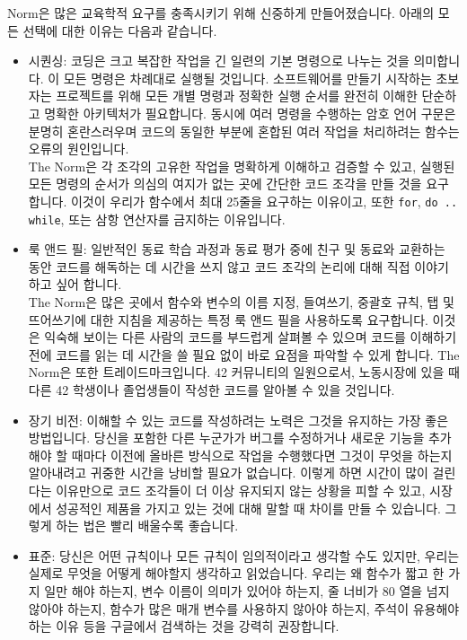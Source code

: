 \documentclass{42-ko}
\begin{document}
        Norm은 많은 교육학적 요구를 충족시키기 위해 신중하게 만들어졌습니다. 아래의
        모든 선택에 대한 이유는 다음과 같습니다.
        \begin{itemize}

        \item 시퀀싱: 코딩은 크고 복잡한 작업을 긴 일련의 기본 명령으로 나누는 것을 의미합니다.
          이 모든 명령은 차례대로 실행될 것입니다. 소프트웨어를 만들기 시작하는 초보자는 프로젝트를 위해 
          모든 개별 명령과 정확한 실행 순서를 완전히 이해한 단순하고 명확한 아키텍처가 필요합니다.
          동시에 여러 명령을 수행하는 암호 언어 구문은 분명히 혼란스러우며 코드의 동일한 부분에 혼합된 
          여러 작업을 처리하려는 함수는 오류의 원인입니다.\\
          The Norm은 각 조각의 고유한 작업을 명확하게 이해하고 검증할 수 있고, 실행된 모든 명령의 순서가 
          의심의 여지가 없는 곳에 간단한 코드 조각을 만들 것을 요구합니다. 이것이 우리가 함수에서 
          최대 25줄을 요구하는 이유이고, 또한 \texttt{for}, \texttt{do .. while}, 또는 삼항 연산자를 
          금지하는 이유입니다.

        \item 룩 앤드 필: 일반적인 동료 학습 과정과 동료 평가 중에 친구 및 동료와 교환하는 동안 
          코드를 해독하는 데 시간을 쓰지 않고 코드 조각의 논리에 대해 직접 이야기하고 싶어 합니다.\\
          The Norm은 많은 곳에서 함수와 변수의 이름 지정, 들여쓰기, 중괄호 규칙, 탭 및 뜨어쓰기에 
          대한 지침을 제공하는 특정 룩 앤드 필을 사용하도록 요구합니다. 이것은 익숙해 보이는 
          다른 사람의 코드를 부드럽게 살펴볼 수 있으며 코드를 이해하기 전에 코드를 읽는 데 시간을 쓸 필요 
          없이 바로 요점을 파악할 수 있게 합니다. The Norm은 또한 트레이드마크입니다. 42 커뮤니티의 
          일원으로서, 노동시장에 있을 때 다른 42 학생이나 졸업생들이 작성한 코드를 알아볼 수 있을 것입니다.

        \item 장기 비전: 이해할 수 있는 코드를 작성하려는 노력은 그것을 유지하는 가장 좋은 방법입니다.
          당신을 포함한 다른 누군가가 버그를 수정하거나 새로운 기능을 추가해야 할 때마다 이전에 올바른 
          방식으로 작업을 수행했다면 그것이 무엇을 하는지 알아내려고 귀중한 시간을 낭비할 필요가 없습니다.
          이렇게 하면 시간이 많이 걸린다는 이유만으로 코드 조각들이 더 이상 유지되지 않는 상황을 피할 수 있고,
          시장에서 성공적인 제품을 가지고 있는 것에 대해 말할 때 차이를 만들 수 있습니다. 그렇게 하는 법은 
          빨리 배울수록 좋습니다.

        \item 표준: 당신은 어떤 규칙이나 모든 규칙이 임의적이라고 생각할 수도 있지만, 우리는 실제로 무엇을 어떻게 
          해야할지 생각하고 읽었습니다. 우리는 왜 함수가 짧고 한 가지 일만 해야 하는지, 변수 이름이 의미가 있어야 
          하는지, 줄 너비가 80 열을 넘지 않아야 하는지, 함수가 많은 매개 변수를 사용하지 않아야 하는지, 주석이 
          유용해야 하는 이유 등을 구글에서 검색하는 것을 강력히 권장합니다.

        \end{itemize}
\end{document}
